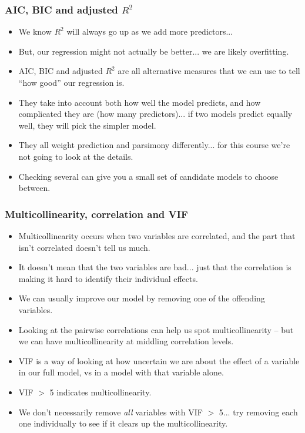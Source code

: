\documentclass{beamer}\usepackage[]{graphicx}\usepackage[]{color}
\begin{document}
\begin{darkframes}
    \begin{frame}
      \frametitle{AIC, BIC and adjusted $R^2$}
      \begin{itemize}
      \item We know $R^2$ will always go up as we add more predictors...
        \item But, our regression might not actually be better... we are likely overfitting.
        \item AIC, BIC and adjusted $R^2$ are all alternative measures that we can use to tell ``how good'' our regression is.
        \item They take into account both how well the model predicts, and how complicated they are (how many predictors)... if two models predict equally well, they will pick the simpler model.
        \item They all weight prediction and parsimony differently... for this course we're not going to look at the details.
        \item Checking several can give you a small set of candidate models to choose between.
      \end{itemize}
    \end{frame}

    \begin{frame}
      \frametitle{Multicollinearity, correlation and VIF}
      \begin{itemize}
      \item Multicollinearity occurs when two variables are correlated, and the part that isn't correlated doesn't tell us much.
      \item It doesn't mean that the two variables are bad... just that the correlation is making it hard to identify their individual effects.
      \item We can usually improve our model by removing one of the offending variables.
        \pause
      \item Looking at the pairwise correlations can help us spot multicollinearity -- but we can have multicollinearity at middling correlation levels.
      \item VIF is a way of looking at how uncertain we are about the effect of a variable in our full model, vs in a model with that variable alone.
      \item VIF $>$ 5 indicates multicollinearity.
      \item We don't necessarily remove \textit{all} variables with VIF $>$ 5... try removing each one individually to see if it clears up the multicollinearity.
      \end{itemize}
    \end{frame}
  \end{darkframes}
\end{document}
